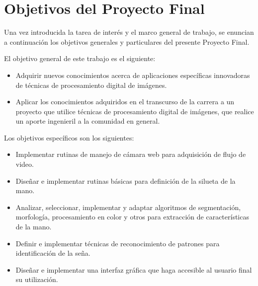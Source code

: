 \section*{Objetivos del Proyecto Final}
Una vez introducida la tarea de interés y el marco general de trabajo, se
enuncian a continuación los objetivos generales y particulares del presente
Proyecto Final.

El objetivo general de este trabajo es el siguiente:

\begin{itemize}
\item Adquirir nuevos conocimientos acerca de aplicaciones específicas innovadoras
de técnicas de procesamiento digital de imágenes.

\item Aplicar los conocimientos adquiridos en el transcurso de la carrera a
un proyecto que utilice técnicas de procesamiento digital de imágenes,
que realice un aporte ingenieril a la comunidad en general.
\end{itemize}

Los objetivos específicos son los siguientes:
\begin{itemize}
	\item Implementar rutinas de manejo de cámara web para adquisición de flujo de video.
	\item Diseñar e implementar rutinas básicas para definición de la silueta de la mano.
	\item Analizar, seleccionar, implementar y adaptar algoritmos de segmentación, morfología, procesamiento en color y otros para extracción de características de la mano.
	\item Definir e implementar técnicas de reconocimiento de patrones para identificación de la seña.
	\item Diseñar e implementar una interfaz gráfica que haga accesible al usuario final su utilización.
\end{itemize}


